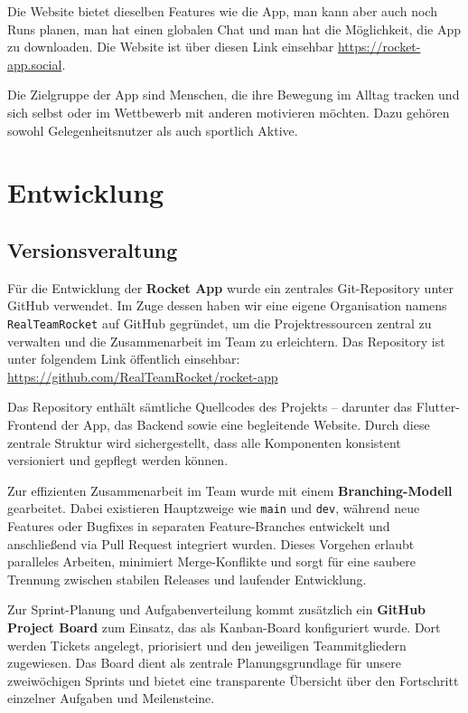 \documentclass[11pt,a4paper]{article}
\begin{document}
Die Website bietet dieselben Features wie die App, man kann aber auch noch Runs planen, man hat einen globalen Chat und man hat die Möglichkeit, die App zu downloaden.
Die Website ist über diesen Link einsehbar \url{https://rocket-app.social}.

Die Zielgruppe der App sind Menschen, die ihre Bewegung im Alltag tracken und sich selbst oder im Wettbewerb mit anderen motivieren möchten. Dazu gehören sowohl Gelegenheitsnutzer als auch sportlich Aktive.

\section{Entwicklung}
\subsection{Versionsveraltung}
Für die Entwicklung der \textbf{Rocket App} wurde ein zentrales Git-Repository unter GitHub verwendet. Im Zuge dessen haben wir eine eigene Organisation namens \texttt{RealTeamRocket} auf GitHub gegründet, um die Projektressourcen zentral zu verwalten und die Zusammenarbeit im Team zu erleichtern. Das Repository ist unter folgendem Link öffentlich einsehbar:
\url{https://github.com/RealTeamRocket/rocket-app}

Das Repository enthält sämtliche Quellcodes des Projekts – darunter das Flutter-Frontend der App, das Backend sowie eine begleitende Website. Durch diese zentrale Struktur wird sichergestellt, dass alle Komponenten konsistent versioniert und gepflegt werden können.

Zur effizienten Zusammenarbeit im Team wurde mit einem \textbf{Branching-Modell} gearbeitet. Dabei existieren Hauptzweige wie \texttt{main} und \texttt{dev}, während neue Features oder Bugfixes in separaten Feature-Branches entwickelt und anschließend via Pull Request integriert wurden. Dieses Vorgehen erlaubt paralleles Arbeiten, minimiert Merge-Konflikte und sorgt für eine saubere Trennung zwischen stabilen Releases und laufender Entwicklung.

Zur Sprint-Planung und Aufgabenverteilung kommt zusätzlich ein \textbf{GitHub Project Board} zum Einsatz, das als Kanban-Board konfiguriert wurde. Dort werden Tickets angelegt, priorisiert und den jeweiligen Teammitgliedern zugewiesen. Das Board dient als zentrale Planungsgrundlage für unsere zweiwöchigen Sprints und bietet eine transparente Übersicht über den Fortschritt einzelner Aufgaben und Meilensteine.
\end{document}
